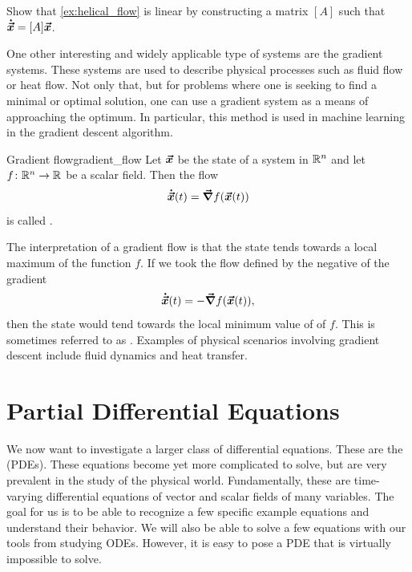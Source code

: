 \begin{exercise}
    Show that \cref{ex:helical_flow} is linear by constructing a matrix $[A]$ such that $\boldsymbol{\dot{\vec{x}}} = [A]\boldsymbol{\vec{x}}$.
\end{exercise}

        One other interesting and widely applicable type of systems are the gradient systems. These systems are used to describe physical processes such as fluid flow or heat flow. Not only that, but for problems where one is seeking to find a minimal or optimal solution, one can use a gradient system as a means of approaching the optimum. In particular, this method is used in machine learning in the gradient descent algorithm. 

        \begin{df}{Gradient flow}{gradient_flow}
        Let $\boldsymbol{\vec{x}}$ be the state of a system in $\mathbb{R}^n$ and let $f\colon \mathbb{R}^n \to \mathbb{R}$ be a scalar field. Then the flow 
        \begin{equation}
        \boldsymbol{\dot{\vec{x}}}(t) = \boldsymbol{\vec{\nabla}} f(\boldsymbol{\vec{x}}(t))
        \end{equation}
        is called  .
        \end{df}

        The interpretation of a gradient flow is that the state tends towards a local maximum of the function $f$. If we took the flow defined by the negative of the gradient
\begin{equation}
    \boldsymbol{\dot{\vec{x}}}(t) = -\boldsymbol{\vec{\nabla}} f(\boldsymbol{\vec{x}}(t)),
\end{equation}
then the state would tend towards the local minimum value of of $f$. This is sometimes referred to as . Examples of physical scenarios involving gradient descent include fluid dynamics and heat transfer.
        
    \section{Partial Differential Equations}

        We now want to investigate a larger class of differential equations.  These are the  (PDEs).  These equations become yet more complicated to solve, but are very prevalent in the study of the physical world. Fundamentally, these are time-varying differential equations of vector and scalar fields of many variables.  The goal for us is to be able to recognize a few specific example equations and understand their behavior.  We will also be able to solve a few equations with our tools from studying ODEs. However, it is easy to pose a PDE that is virtually impossible to solve.  
        
